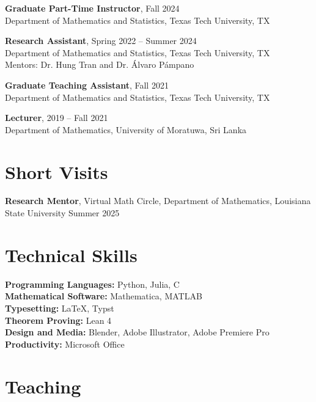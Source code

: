 \documentclass[11pt]{article}
\begin{document}
\vspace{6pt}
\textbf{Graduate Part-Time Instructor}, Fall 2024\\
Department of Mathematics and Statistics, Texas Tech University, TX

\vspace{6pt}
\textbf{Research Assistant}, Spring 2022 -- Summer 2024\\
Department of Mathematics and Statistics, Texas Tech University, TX\\
Mentors: Dr. Hung Tran and Dr. \'Alvaro P\'ampano

\vspace{6pt}
\textbf{Graduate Teaching Assistant}, Fall 2021\\
Department of Mathematics and Statistics, Texas Tech University, TX

\vspace{6pt}
\textbf{Lecturer}, 2019 -- Fall 2021\\
Department of Mathematics, University of Moratuwa, Sri Lanka

\section*{Short Visits}

\textbf{Research Mentor}, Virtual Math Circle, Department of Mathematics, Louisiana State University \hfill Summer 2025

\section*{Technical Skills}

\textbf{Programming Languages:} Python, Julia, C \\
\textbf{Mathematical Software:} Mathematica, MATLAB\\
\textbf{Typesetting:} LaTeX, Typst\\
\textbf{Theorem Proving:} Lean 4\\
\textbf{Design and Media:} Blender, Adobe Illustrator, Adobe Premiere Pro\\
\textbf{Productivity:} Microsoft Office

\section*{Teaching}
\end{document}
